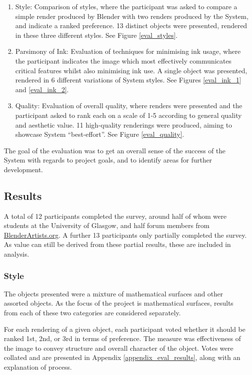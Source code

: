 \begin{enumerate}
	\item{Style: Comparison of styles, where the participant was asked to compare a simple render produced by Blender with two renders produced by the System, and indicate a ranked preference. 13 distinct objects were presented, rendered in these three different styles. See Figure \ref{eval_styles}.}
	\item{Parsimony of Ink: Evaluation of techniques for minimising ink usage, where the participant indicates the image which most effectively communicates critical features whilst also minimising ink use. A single object was presented, rendered in 6 different variations of System styles. See Figures \ref{eval_ink_1} and \ref{eval_ink_2}.}
	\item{Quality: Evaluation of overall quality, where renders were presented and the participant asked to rank each on a scale of 1-5 according to general quality and aesthetic value. 11 high-quality renderings were produced, aiming to showcase System ``best-effort''. See Figure \ref{eval_quality}.}
\end{enumerate}

The goal of the evaluation was to get an overall sense of the success of the System with regards to project goals, and to identify areas for further development.

\subsection{Results}

A total of 12 participants completed the survey, around half of whom were students at the University of Glasgow, and half forum members from \url{BlenderArtists.org}. A further 13 participants only partially completed the survey. As value can still be derived from these partial results, these are included in analysis.

\subsubsection{Style}

The objects presented were a mixture of mathematical surfaces and other assorted objects.
As the focus of the project is mathematical surfaces, results from each of these two categories are considered separately.

For each rendering of a given object, each participant voted whether it should be ranked 1st, 2nd, or 3rd in terms of preference. The measure was effectiveness of the image to convey structure and overall character of the object. Votes were collated and are presented in Appendix \ref{appendix_eval_results}, along with an explanation of process.

